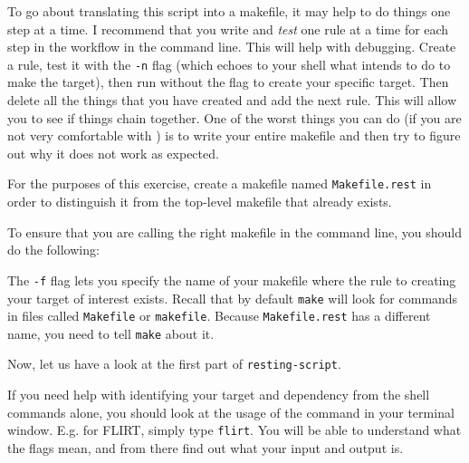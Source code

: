
To go about translating this script into a makefile, it may help to do things one step at a time. I recommend that you write and \emph{test} one rule at a time for each step in the workflow in the command line. This will help with debugging. Create a rule, test it with the \texttt{-n} flag (which echoes to your shell what \maken{} intends to do to make the target), then run \maken{} without the flag to create your specific target. Then delete all the things that you have created and add the next rule. This will allow you to see if things chain together. One of the worst things you can do (if you are not very comfortable with \maken{}) is to write your entire makefile and then try to figure out why it does not work as expected. 

For the purposes of this exercise, create a makefile named \texttt{Makefile.rest} in order to distinguish it from the top-level makefile that already exists.

To ensure that you are calling the right makefile in the command line, you should do the following: 

The \texttt{-f} flag lets you specify the name of your makefile where the rule to creating your target of interest exists. Recall that by default \texttt{make} will look for commands in files called \texttt{Makefile} or \texttt{makefile}. Because \texttt{Makefile.rest} has a different name, you need to tell \texttt{make} about it. 

Now, let us have a look at the first part of \texttt{resting-script}.

If you need help with identifying your target and dependency from the shell commands alone, you should look at the usage of the command in your terminal window. E.g. for FLIRT, simply type \texttt{flirt}. You will be able to understand what the flags mean, and from there find out what your input and output is.

